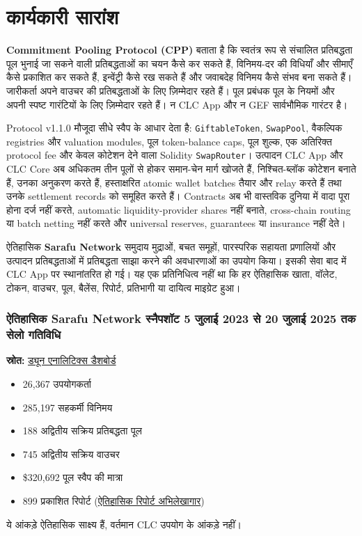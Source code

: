 \documentclass[11pt]{article}
\begin{document}
\section*{कार्यकारी सारांश}

\textbf{Commitment Pooling Protocol (CPP)} बताता है कि स्वतंत्र रूप से संचालित प्रतिबद्धता पूल भुनाई जा सकने वाली प्रतिबद्धताओं का चयन कैसे कर सकते हैं, विनिमय-दर की विधियाँ और सीमाएँ कैसे प्रकाशित कर सकते हैं, इन्वेंट्री कैसे रख सकते हैं और जवाबदेह विनिमय कैसे संभव बना सकते हैं। जारीकर्ता अपने वाउचर की प्रतिबद्धताओं के लिए ज़िम्मेदार रहते हैं। पूल प्रबंधक पूल के नियमों और अपनी स्पष्ट गारंटियों के लिए ज़िम्मेदार रहते हैं। न CLC App और न GEF सार्वभौमिक गारंटर है।

Protocol v1.1.0 मौजूदा सीधे स्वैप के आधार देता है: \texttt{GiftableToken}, \texttt{SwapPool}, वैकल्पिक registries और valuation modules, पूल token-balance caps, पूल शुल्क, एक अतिरिक्त protocol fee और केवल कोटेशन देने वाला Solidity \texttt{SwapRouter}। उत्पादन CLC App और CLC Core अब अधिकतम तीन पूलों से होकर समान-चेन मार्ग खोजते हैं, निश्चित-ब्लॉक कोटेशन बनाते हैं, उनका अनुकरण करते हैं, हस्ताक्षरित atomic wallet batches तैयार और relay करते हैं तथा उनके settlement records को समूहित करते हैं। Contracts अब भी वास्तविक दुनिया में वादा पूरा होना दर्ज नहीं करते, automatic liquidity-provider shares नहीं बनाते, cross-chain routing या batch netting नहीं करते और universal reserves, guarantees या insurance नहीं देते।

ऐतिहासिक \textbf{Sarafu Network} समुदाय मुद्राओं, बचत समूहों, पारस्परिक सहायता प्रणालियों और उत्पादन प्रतिबद्धताओं में प्रतिबद्धता साझा करने की अवधारणाओं का उपयोग किया। इसकी सेवा बाद में CLC App पर स्थानांतरित हो गई। यह एक प्रतिनिधित्व नहीं था कि हर ऐतिहासिक खाता, वॉलेट, टोकन, वाउचर, पूल, बैलेंस, रिपोर्ट, प्रतिभागी या दायित्व माइग्रेट हुआ।

\subsubsection*{ऐतिहासिक Sarafu Network स्नैपशॉट  5 जुलाई 2023 से 20 जुलाई 2025 तक सेलो गतिविधि}

\textbf{स्रोत:} \href{https://dune.com/grassrootseconomics/sarafu-network}{ड्यून एनालिटिक्स डैशबोर्ड}

\begin{itemize}[leftmargin=*]
\item 26,367 उपयोगकर्ता
\item 285,197 सहकर्मी विनिमय
\item 188 अद्वितीय सक्रिय प्रतिबद्धता पूल
\item 745 अद्वितीय सक्रिय वाउचर
\item \$320,692 पूल स्वैप की मात्रा
\item 899 प्रकाशित रिपोर्ट (\href{https://sarafu.network/reports}{ऐतिहासिक रिपोर्ट अभिलेखागार})
\end{itemize}
ये आंकड़े ऐतिहासिक साक्ष्य हैं, वर्तमान CLC उपयोग के आंकड़े नहीं।
\end{document}

